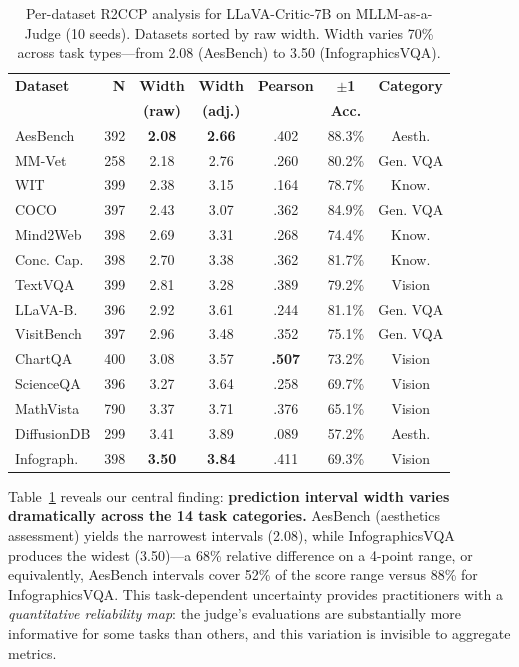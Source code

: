 \documentclass{article}
\begin{document}
\begin{table}[t]
\centering
\caption{Per-dataset R2CCP analysis for LLaVA-Critic-7B on MLLM-as-a-Judge (10 seeds). Datasets sorted by raw width. Width varies 70\% across task types---from 2.08 (AesBench) to 3.50 (InfographicsVQA).}
\label{tab:per_dataset}
\small
\begin{tabular}{lrccccc}
\toprule
\textbf{Dataset} & \textbf{N} & \textbf{Width} & \textbf{Width} & \textbf{Pearson} & $\pm$\textbf{1} & \textbf{Category} \\
& & \textbf{(raw)} & \textbf{(adj.)} & & \textbf{Acc.} & \\
\midrule
AesBench & 392 & \textbf{2.08} & \textbf{2.66} & .402 & 88.3\% & Aesth. \\
MM-Vet & 258 & 2.18 & 2.76 & .260 & 80.2\% & Gen. VQA \\
WIT & 399 & 2.38 & 3.15 & .164 & 78.7\% & Know. \\
COCO & 397 & 2.43 & 3.07 & .362 & 84.9\% & Gen. VQA \\
Mind2Web & 398 & 2.69 & 3.31 & .268 & 74.4\% & Know. \\
Conc. Cap. & 398 & 2.70 & 3.38 & .362 & 81.7\% & Know. \\
TextVQA & 399 & 2.81 & 3.28 & .389 & 79.2\% & Vision \\
LLaVA-B. & 396 & 2.92 & 3.61 & .244 & 81.1\% & Gen. VQA \\
VisitBench & 397 & 2.96 & 3.48 & .352 & 75.1\% & Gen. VQA \\
ChartQA & 400 & 3.08 & 3.57 & \textbf{.507} & 73.2\% & Vision \\
ScienceQA & 396 & 3.27 & 3.64 & .258 & 69.7\% & Vision \\
MathVista & 790 & 3.37 & 3.71 & .376 & 65.1\% & Vision \\
DiffusionDB & 299 & 3.41 & 3.89 & .089 & 57.2\% & Aesth. \\
Infograph. & 398 & \textbf{3.50} & \textbf{3.84} & .411 & 69.3\% & Vision \\
\bottomrule
\end{tabular}
\end{table}

Table~\ref{tab:per_dataset} reveals our central finding: \textbf{prediction interval width varies dramatically across the 14 task categories.} AesBench (aesthetics assessment) yields the narrowest intervals (2.08), while InfographicsVQA produces the widest (3.50)---a 68\% relative difference on a 4-point range, or equivalently, AesBench intervals cover 52\% of the score range versus 88\% for InfographicsVQA. This task-dependent uncertainty provides practitioners with a \emph{quantitative reliability map}: the judge's evaluations are substantially more informative for some tasks than others, and this variation is invisible to aggregate metrics.
\end{document}
